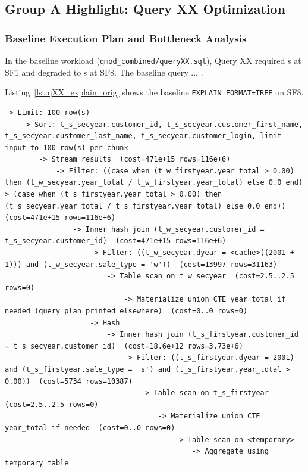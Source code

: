 \documentclass{ULBreport}
\begin{document}
\subsection{Group A Highlight: Query XX Optimization}

\subsubsection{Baseline Execution Plan and Bottleneck Analysis}
In the baseline workload (\texttt{qmod\_combined/queryXX.sql}), Query XX required s at SF1 and degraded to s at SF8. The baseline query ... .

Listing~\ref{lst:qXX_explain_orig} shows the baseline \texttt{EXPLAIN FORMAT=TREE} on SF8.

\begin{lstlisting}[caption={Baseline \texttt{EXPLAIN FORMAT=TREE} on SF8 for Query 11}, label={lst:q11_explain_orig}, basicstyle=\ttfamily\scriptsize, breaklines=true, frame=single]
-> Limit: 100 row(s)
    -> Sort: t_s_secyear.customer_id, t_s_secyear.customer_first_name, t_s_secyear.customer_last_name, t_s_secyear.customer_login, limit input to 100 row(s) per chunk
        -> Stream results  (cost=471e+15 rows=116e+6)
            -> Filter: ((case when (t_w_firstyear.year_total > 0.00) then (t_w_secyear.year_total / t_w_firstyear.year_total) else 0.0 end) > (case when (t_s_firstyear.year_total > 0.00) then (t_s_secyear.year_total / t_s_firstyear.year_total) else 0.0 end))  (cost=471e+15 rows=116e+6)
                -> Inner hash join (t_w_secyear.customer_id = t_s_secyear.customer_id)  (cost=471e+15 rows=116e+6)
                    -> Filter: ((t_w_secyear.dyear = <cache>((2001 + 1))) and (t_w_secyear.sale_type = 'w'))  (cost=13997 rows=31163)
                        -> Table scan on t_w_secyear  (cost=2.5..2.5 rows=0)
                            -> Materialize union CTE year_total if needed (query plan printed elsewhere)  (cost=0..0 rows=0)
                    -> Hash
                        -> Inner hash join (t_s_firstyear.customer_id = t_s_secyear.customer_id)  (cost=18.6e+12 rows=3.73e+6)
                            -> Filter: ((t_s_firstyear.dyear = 2001) and (t_s_firstyear.sale_type = 's') and (t_s_firstyear.year_total > 0.00))  (cost=5734 rows=10387)
                                -> Table scan on t_s_firstyear  (cost=2.5..2.5 rows=0)
                                    -> Materialize union CTE year_total if needed  (cost=0..0 rows=0)
                                        -> Table scan on <temporary>
                                            -> Aggregate using temporary table

\end{lstlisting}
\end{document}
